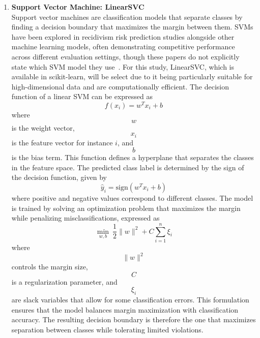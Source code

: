 \documentclass[12pt]{article}
\begin{document}
\begin{enumerate}
    Due to its optimization techniques, such as gradient-based learning and regularization, XGBoost is both computationally efficient and highly accurate. Multiple studies have explored XGBoost in recidivism risk prediction, with results showing it yielded competitive or superior performance as compared to other models~\cite{won2019recidivism,rajendran2021predicting}. The model, combined with extensive feature engineering and hyperparameter tuning, was also used in the winning solution of the National Institute of Justice (NIJ) Recidivism Forecasting Challenge~\cite{han2022xgboost}. Unlike the other models, XGBoost requires explicit parameter specification due to the absence of universally effective default settings. Hence, for this study, a set of predefined hyperparameters will be used to ensure stable and efficient training. 

  \item \textbf{Support Vector Machine: LinearSVC}\\
    \tab Support vector machines are classification models that separate classes by finding a decision boundary that maximizes the margin between them. SVMs have been explored in recidivism risk prediction studies alongside other machine learning models, often demonstrating competitive performance across different evaluation settings, though these papers do not explicitly state which SVM model they use~\cite{duwe2017out, tolan2019machine,ozkan2017predicting}. For this study, LinearSVC, which is available in scikit-learn, will be select due to it being particularly suitable for high-dimensional data and are computationally efficient. The decision function of a linear SVM can be expressed as \[ f(x_i) = w^T x_i + b \] where \[ w \] is the weight vector, \[ x_i \] is the feature vector for instance \(i\), and \[ b \] is the bias term. This function defines a hyperplane that separates the classes in the feature space. The predicted class label is determined by the sign of the decision function, given by \[ \hat{y}_i = \text{sign}(w^T x_i + b) \] where positive and negative values correspond to different classes. The model is trained by solving an optimization problem that maximizes the margin while penalizing misclassifications, expressed as \[ \min_{w,b} \ \frac{1}{2} \|w\|^2 + C \sum_{i=1}^{n} \xi_i \] where \[ \|w\|^2 \] controls the margin size, \[ C \] is a regularization parameter, and \[ \xi_i \] are slack variables that allow for some classification errors. This formulation ensures that the model balances margin maximization with classification accuracy. The resulting decision boundary is therefore the one that maximizes separation between classes while tolerating limited violations.\\ 
    

\end{enumerate}
\end{document}
